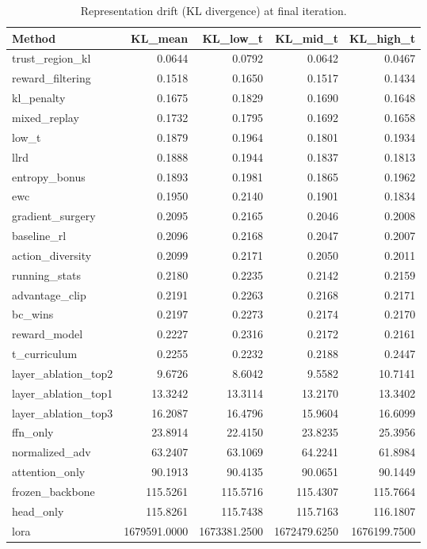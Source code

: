 \begin{table}[htbp]
\centering
\caption{Representation drift (KL divergence) at final iteration.}
\label{tab:repr_drift}
\begin{tabular}{lrrrr}
\toprule
\textbf{Method} & \textbf{KL\_mean} & \textbf{KL\_low\_t} & \textbf{KL\_mid\_t} & \textbf{KL\_high\_t} \\
\midrule
trust\_region\_kl & 0.0644 & 0.0792 & 0.0642 & 0.0467 \\
reward\_filtering & 0.1518 & 0.1650 & 0.1517 & 0.1434 \\
kl\_penalty & 0.1675 & 0.1829 & 0.1690 & 0.1648 \\
mixed\_replay & 0.1732 & 0.1795 & 0.1692 & 0.1658 \\
low\_t & 0.1879 & 0.1964 & 0.1801 & 0.1934 \\
llrd & 0.1888 & 0.1944 & 0.1837 & 0.1813 \\
entropy\_bonus & 0.1893 & 0.1981 & 0.1865 & 0.1962 \\
ewc & 0.1950 & 0.2140 & 0.1901 & 0.1834 \\
gradient\_surgery & 0.2095 & 0.2165 & 0.2046 & 0.2008 \\
baseline\_rl & 0.2096 & 0.2168 & 0.2047 & 0.2007 \\
action\_diversity & 0.2099 & 0.2171 & 0.2050 & 0.2011 \\
running\_stats & 0.2180 & 0.2235 & 0.2142 & 0.2159 \\
advantage\_clip & 0.2191 & 0.2263 & 0.2168 & 0.2171 \\
bc\_wins & 0.2197 & 0.2273 & 0.2174 & 0.2170 \\
reward\_model & 0.2227 & 0.2316 & 0.2172 & 0.2161 \\
t\_curriculum & 0.2255 & 0.2232 & 0.2188 & 0.2447 \\
layer\_ablation\_top2 & 9.6726 & 8.6042 & 9.5582 & 10.7141 \\
layer\_ablation\_top1 & 13.3242 & 13.3114 & 13.2170 & 13.3402 \\
layer\_ablation\_top3 & 16.2087 & 16.4796 & 15.9604 & 16.6099 \\
ffn\_only & 23.8914 & 22.4150 & 23.8235 & 25.3956 \\
normalized\_adv & 63.2407 & 63.1069 & 64.2241 & 61.8984 \\
attention\_only & 90.1913 & 90.4135 & 90.0651 & 90.1449 \\
frozen\_backbone & 115.5261 & 115.5716 & 115.4307 & 115.7664 \\
head\_only & 115.8261 & 115.7438 & 115.7163 & 116.1807 \\
lora & 1679591.0000 & 1673381.2500 & 1672479.6250 & 1676199.7500 \\
\bottomrule
\end{tabular}
\end{table}